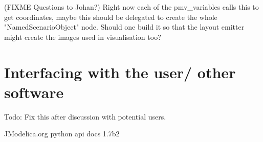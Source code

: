 \documentclass{report}
\begin{document}
(FIXME Questions to Johan?) Right now each of the pmv\_variables calls this to get coordinates, maybe this should be delegated to create the whole "NamedScenarioObject" node. Should one build it so that the layout emitter might create the images used in visualisation too? \\\newline

\chapter{Interfacing with the user/ other software}
Todo: Fix this after discussion with potential users.
\begin{thebibliography}{99}
 JModelica.org python api docs 
 1.7b2
\end{thebibliography}

\printindex
\end{document}
